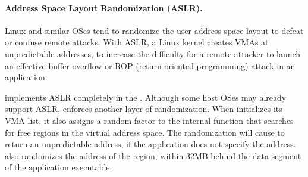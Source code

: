\paragraph{Address Space Layout Randomization (ASLR).}


Linux and similar OSes tend to randomize the user address space layout to defeat or confuse remote attacks.
With ASLR, a Linux kernel creates VMAs at unpredictable addresses,
to increase the difficulty for a remote attacker to launch an effective buffer overflow or ROP (return-oriented programming) attack in an application.



\thelibos{} implements ASLR completely in the \libos{}. Although some host OSes may already support ASLR, \thelibos{} enforces another layer of randomization.
When \thelibos{} initializes its VMA list, it also assigns a random factor to the internal function that searches for free regions in the virtual address space.
The randomization will cause  to return an unpredictable address, if the application does not specify the address.
\thelibos{} also randomizes the address of the  region, within 32MB behind the data segment of the application executable.






